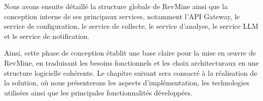 Nous avons ensuite détaillé la structure globale de RevMine ainsi que la conception interne de ses principaux services, notamment l’API Gateway, le service de configuration, le service de collecte, le service d’analyse, le service LLM et le service de notification.

Ainsi, cette phase de conception établit une base claire pour la mise en œuvre de RevMine, en traduisant les besoins fonctionnels et les choix architecturaux en une structure logicielle cohérente. Le chapitre suivant sera consacré à la réalisation de la solution, où nous présenterons les aspects d’implémentation, les technologies utilisées ainsi que les principales fonctionnalités développées.